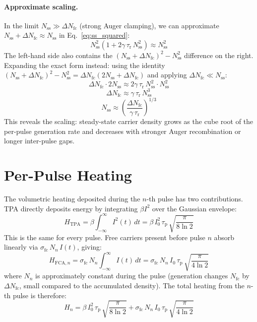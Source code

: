 \documentclass[11pt,a4paper]{article}
\begin{document}
\paragraph{Approximate scaling.} In the limit $N_\text{ss} \gg \Delta N_\text{fc}$ (strong Auger clamping), we can approximate $N_\text{ss} + \Delta N_\text{fc} \approx N_\text{ss}$ in Eq.~\eqref{eq:ss_squared}:
\[
N_\text{ss}^2\left(1 + 2\gamma\,\tau_\text{r}\,N_\text{ss}^2\right) \approx N_\text{ss}^2
\]
The left-hand side also contains the $(N_\text{ss} + \Delta N_\text{fc})^2 - N_\text{ss}^2$ difference on the right. Expanding the exact form instead: using the identity $(N_\text{ss} + \Delta N_\text{fc})^2 - N_\text{ss}^2 = \Delta N_\text{fc}(2N_\text{ss} + \Delta N_\text{fc})$ and applying $\Delta N_\text{fc} \ll N_\text{ss}$:
\[
\Delta N_\text{fc}\cdot 2N_\text{ss} \approx 2\gamma\,\tau_\text{r}\,N_\text{ss}^2 \cdot N_\text{ss}^2
\]
\[
\Delta N_\text{fc} \approx \gamma\,\tau_\text{r}\,N_\text{ss}^3
\]
\begin{equation}
\boxed{N_\text{ss} \approx \left(\frac{\Delta N_\text{fc}}{\gamma\,\tau_\text{r}}\right)^{1/3}}
\label{eq:ss_strong}
\end{equation}
This reveals the scaling: steady-state carrier density grows as the cube root of the per-pulse generation rate and decreases with stronger Auger recombination or longer inter-pulse gaps.

\section{Per-Pulse Heating}

The volumetric heating deposited during the $n$-th pulse has two contributions. TPA directly deposits energy by integrating $\beta I^2$ over the Gaussian envelope:
\begin{equation}
H_\text{TPA} = \beta \int_{-\infty}^{\infty} I^2(t)\,dt = \beta\,I_0^2\,\tau_\text{p}\,\sqrt{\frac{\pi}{8\ln 2}}
\label{eq:H_tpa}
\end{equation}
This is the same for every pulse. Free carriers present before pulse $n$ absorb linearly via $\sigma_\text{fc}\,N_n\,I(t)$, giving:
\begin{equation}
H_{\text{FCA},n} = \sigma_\text{fc}\,N_n \int_{-\infty}^{\infty} I(t)\,dt = \sigma_\text{fc}\,N_n\,I_0\,\tau_\text{p}\,\sqrt{\frac{\pi}{4\ln 2}}
\label{eq:H_fca}
\end{equation}
where $N_n$ is approximately constant during the pulse (generation changes $N_\text{fc}$ by $\Delta N_\text{fc}$, small compared to the accumulated density). The total heating from the $n$-th pulse is therefore:
\begin{equation}
H_n = \beta\,I_0^2\,\tau_\text{p}\,\sqrt{\frac{\pi}{8\ln 2}} + \sigma_\text{fc}\,N_n\,I_0\,\tau_\text{p}\,\sqrt{\frac{\pi}{4\ln 2}}
\label{eq:H_n}
\end{equation}
\end{document}
